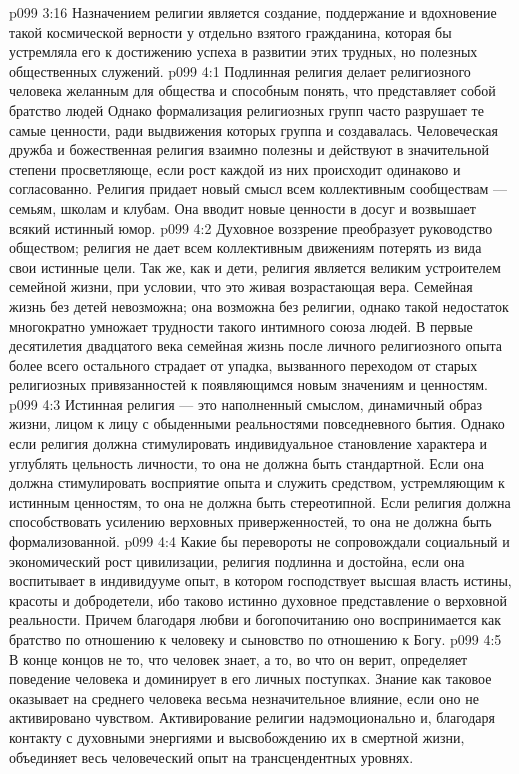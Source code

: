 \vs p099 3:16 Назначением религии является создание, поддержание и вдохновение такой космической верности у отдельно взятого гражданина, которая бы устремляла его к достижению успеха в развитии этих трудных, но полезных общественных служений.
\vs p099 4:1 Подлинная религия делает религиозного человека желанным для общества и способным понять, что представляет собой братство людей Однако формализация религиозных групп часто разрушает те самые ценности, ради выдвижения которых группа и создавалась. Человеческая дружба и божественная религия взаимно полезны и действуют в значительной степени просветляюще, если рост каждой из них происходит одинаково и согласованно. Религия придает новый смысл всем коллективным сообществам --- семьям, школам и клубам. Она вводит новые ценности в досуг и возвышает всякий истинный юмор.
\vs p099 4:2 Духовное воззрение преобразует руководство обществом; религия не дает всем коллективным движениям потерять из вида свои истинные цели. Так же, как и дети, религия является великим устроителем семейной жизни, при условии, что это живая возрастающая вера. Семейная жизнь без детей невозможна; она возможна без религии, однако такой недостаток многократно умножает трудности такого интимного союза людей. В первые десятилетия двадцатого века семейная жизнь после личного религиозного опыта более всего остального страдает от упадка, вызванного переходом от старых религиозных привязанностей к появляющимся новым значениям и ценностям.
\vs p099 4:3 \pc Истинная религия --- это наполненный смыслом, динамичный образ жизни, лицом к лицу с обыденными реальностями повседневного бытия. Однако если религия должна стимулировать индивидуальное становление характера и углублять цельность личности, то она не должна быть стандартной. Если она должна стимулировать восприятие опыта и служить средством, устремляющим к истинным ценностям, то она не должна быть стереотипной. Если религия должна способствовать усилению верховных приверженностей, то она не должна быть формализованной.
\vs p099 4:4 Какие бы перевороты не сопровождали социальный и экономический рост цивилизации, религия подлинна и достойна, если она воспитывает в индивидууме опыт, в котором господствует высшая власть истины, красоты и добродетели, ибо таково истинно духовное представление о верховной реальности. Причем благодаря любви и богопочитанию оно воспринимается как братство по отношению к человеку и сыновство по отношению к Богу.
\vs p099 4:5 В конце концов не то, что человек знает, а то, во что он верит, определяет поведение человека и доминирует в его личных поступках. Знание как таковое оказывает на среднего человека весьма незначительное влияние, если оно не активировано чувством. Активирование религии надэмоционально и, благодаря контакту с духовными энергиями и высвобождению их в смертной жизни, объединяет весь человеческий опыт на трансцендентных уровнях.
